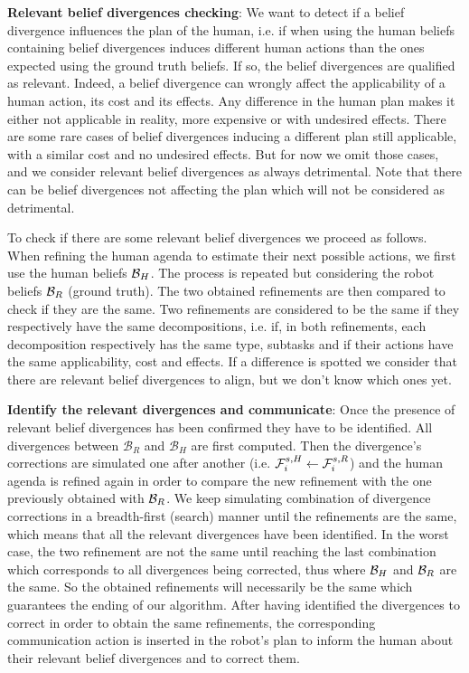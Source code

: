 \documentclass[letterpaper]{article} %
\begin{document}
\textbf{Relevant belief divergences checking}:
We want to detect if a belief divergence influences the plan of the human, i.e. if when using the human beliefs containing belief divergences induces different human actions than the ones expected using the ground truth beliefs. If so, the belief divergences are qualified as relevant. Indeed, a belief divergence can wrongly affect the applicability of a human action, its cost and its effects. 
Any difference in the human plan makes it either not applicable in reality, more expensive or with undesired effects. There are some rare cases of belief divergences inducing a different plan still applicable, with a similar cost and no undesired effects. But for now we omit those cases, and we consider relevant belief divergences as always detrimental. 
Note that there can be belief divergences not affecting the plan which will not be considered as detrimental.

To check if there are some relevant belief divergences we proceed as follows. When refining the human agenda to estimate their next possible actions, we first use the human beliefs $\mathcal{B}_H$. The process is repeated but considering the robot beliefs $\mathcal{B}_R$ (ground truth). The two obtained refinements are then compared to check if they are the same. Two refinements are considered to be the same if they respectively have the same decompositions, i.e. if, in both refinements, each decomposition respectively has the same type, subtasks and if their actions have the same applicability, cost and effects. 
If a difference is spotted we consider that there are relevant belief divergences to align, but we don't know which ones yet.

\textbf{Identify the relevant divergences and communicate}: 
Once the presence of relevant belief divergences has been confirmed they have to be identified. All divergences between $\mathcal{B}_R$ and $\mathcal{B}_H$ are first computed. Then the divergence's corrections are simulated one after another (i.e. $ \mathcal{F}^{s,H}_{i} \gets \mathcal{F}^{s,R}_{i}$) and the human agenda is refined again in order to compare the new refinement with the one previously obtained with $\mathcal{B}_R$. We keep simulating combination of divergence corrections in a breadth-first (search) manner until the refinements are the same, which means that all the relevant divergences have been identified. In the worst case, the two refinement are not the same until reaching the last combination which corresponds to all divergences being corrected, thus where $\mathcal{B}_H$ and $\mathcal{B}_R$ are the same. So the obtained refinements will necessarily be the same which guarantees the ending of our algorithm. After having identified the divergences to correct in order to obtain the same refinements, the corresponding communication action is inserted in the robot's plan to inform the human about their relevant belief divergences and to correct them.
    
\end{document}
